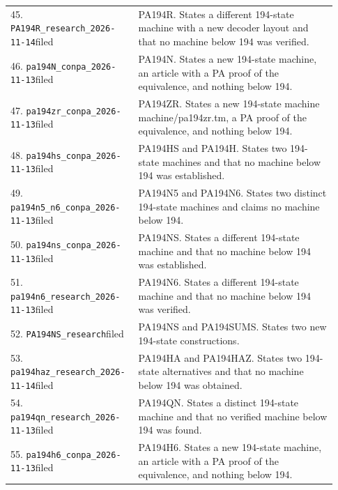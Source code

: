 {\begin{longtable}{@{}p{0.34\linewidth}p{0.59\linewidth}@{}}
45. \nolinkurl{PA194R_research_2026-11-14}\newline filed&PA194R. States a different 194-state machine with a new decoder layout and that no machine below 194 was verified.\\[4pt]
46. \nolinkurl{pa194N_conpa_2026-11-13}\newline filed&PA194N. States a new 194-state machine, an article with a PA proof of the equivalence, and nothing below 194.\\[4pt]
47. \nolinkurl{pa194zr_conpa_2026-11-13}\newline filed&PA194ZR. States a new 194-state machine machine/pa194zr.tm, a PA proof of the equivalence, and nothing below 194.\\[4pt]
48. \nolinkurl{pa194hs_conpa_2026-11-13}\newline filed&PA194HS and PA194H. States two 194-state machines and that no machine below 194 was established.\\[4pt]
49. \nolinkurl{pa194n5_n6_conpa_2026-11-13}\newline filed&PA194N5 and PA194N6. States two distinct 194-state machines and claims no machine below 194.\\[4pt]
50. \nolinkurl{pa194ns_conpa_2026-11-13}\newline filed&PA194NS. States a different 194-state machine and that no machine below 194 was established.\\[4pt]
51. \nolinkurl{pa194n6_research_2026-11-13}\newline filed&PA194N6. States a different 194-state machine and that no machine below 194 was verified.\\[4pt]
52. \nolinkurl{PA194NS_research}\newline filed&PA194NS and PA194SUMS. States two new 194-state constructions.\\[4pt]
53. \nolinkurl{pa194haz_research_2026-11-14}\newline filed&PA194HA and PA194HAZ. States two 194-state alternatives and that no machine below 194 was obtained.\\[4pt]
54. \nolinkurl{pa194qn_research_2026-11-13}\newline filed&PA194QN. States a distinct 194-state machine and that no verified machine below 194 was found.\\[4pt]
55. \nolinkurl{pa194h6_conpa_2026-11-13}\newline filed&PA194H6. States a new 194-state machine, an article with a PA proof of the equivalence, and nothing below 194.\\[4pt]

\end{longtable}}
